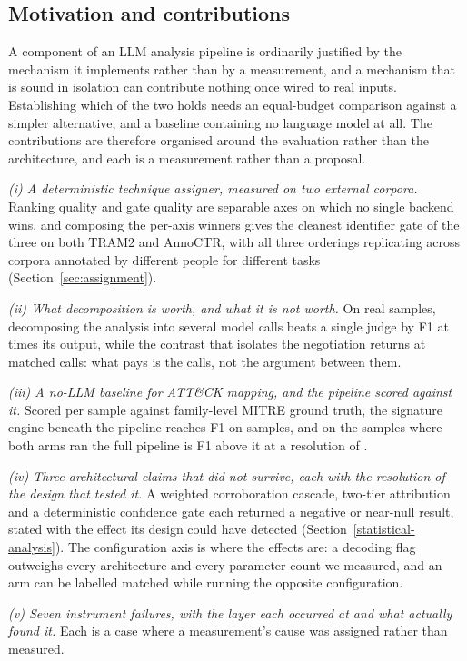 \subsection{Motivation and contributions}
\label{sec:contributions}

A component of an LLM analysis pipeline is ordinarily justified by the mechanism it implements
rather than by a measurement, and a mechanism that is sound in isolation can contribute nothing once
wired to real inputs. Establishing which of the two holds needs an equal-budget comparison against a
simpler alternative, and a baseline containing no language model at all. The contributions are
therefore organised around the evaluation rather than the architecture, and each is a measurement
rather than a proposal.

\emph{(i) A deterministic technique assigner, measured on two external corpora.} Ranking quality and
gate quality are separable axes on which no single backend wins, and composing the per-axis winners
gives the cleanest identifier gate of the three on both TRAM2 and AnnoCTR, with all three orderings
replicating across corpora annotated by different people for different tasks
(Section~\ref{sec:assignment}).

\emph{(ii) What decomposition is worth, and what it is not worth.} On
 real samples, decomposing the analysis into several model calls beats
a single judge by  F1 at  times
its output, while the contrast that isolates the negotiation returns  at
matched calls: what pays is the calls, not the argument between them.

\emph{(iii) A no-LLM baseline for ATT\&CK mapping, and the pipeline scored against it.} Scored per
sample against family-level MITRE ground truth, the signature engine beneath the pipeline reaches F1
  on  samples, and on the samples
where both arms ran the full pipeline is  F1 above it at a resolution of
.

\emph{(iv) Three architectural claims that did not survive, each with the resolution of the design
that tested it.} A weighted corroboration cascade, two-tier attribution and a deterministic
confidence gate each returned a negative or near-null result, stated with the effect its design
could have detected (Section~\ref{statistical-analysis}). The configuration axis is where the
effects are: a decoding flag outweighs every architecture and every parameter count we measured, and
an arm can be labelled matched while running the opposite configuration.

\emph{(v) Seven instrument failures, with the layer each occurred at and what actually found it.}
Each is a case where a measurement's cause was assigned rather than measured.
